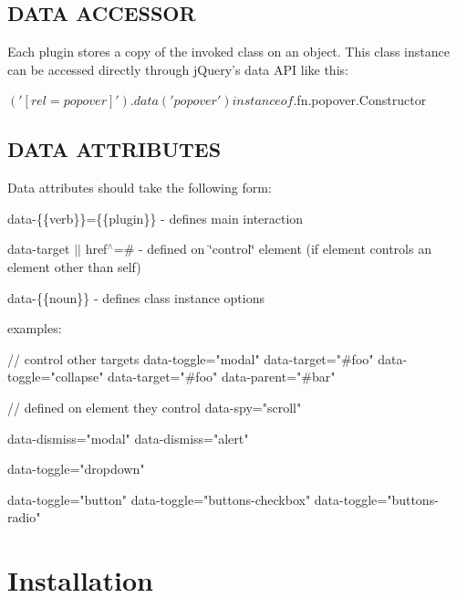 \subsection*{D\-A\-T\-A A\-C\-C\-E\-S\-S\-O\-R}

Each plugin stores a copy of the invoked class on an object. This class instance can be accessed directly through j\-Query's data A\-P\-I like this\-: \begin{DoxyVerb}$('[rel=popover]').data('popover') instanceof $.fn.popover.Constructor
\end{DoxyVerb}






\subsection*{D\-A\-T\-A A\-T\-T\-R\-I\-B\-U\-T\-E\-S}

Data attributes should take the following form\-:


\begin{DoxyItemize}
\item data-\/\{\{verb\}\}=\{\{plugin\}\} -\/ defines main interaction
\item data-\/target $|$$|$ href$^\wedge$=\# -\/ defined on \char`\"{}control\char`\"{} element (if element controls an element other than self)
\item data-\/\{\{noun\}\} -\/ defines class instance options
\end{DoxyItemize}

examples\-: \begin{DoxyVerb}// control other targets
data-toggle="modal" data-target="#foo"
data-toggle="collapse" data-target="#foo" data-parent="#bar"

// defined on element they control
data-spy="scroll"

data-dismiss="modal"
data-dismiss="alert"

data-toggle="dropdown"

data-toggle="button"
data-toggle="buttons-checkbox"
data-toggle="buttons-radio"\end{DoxyVerb}


\section*{Installation}

